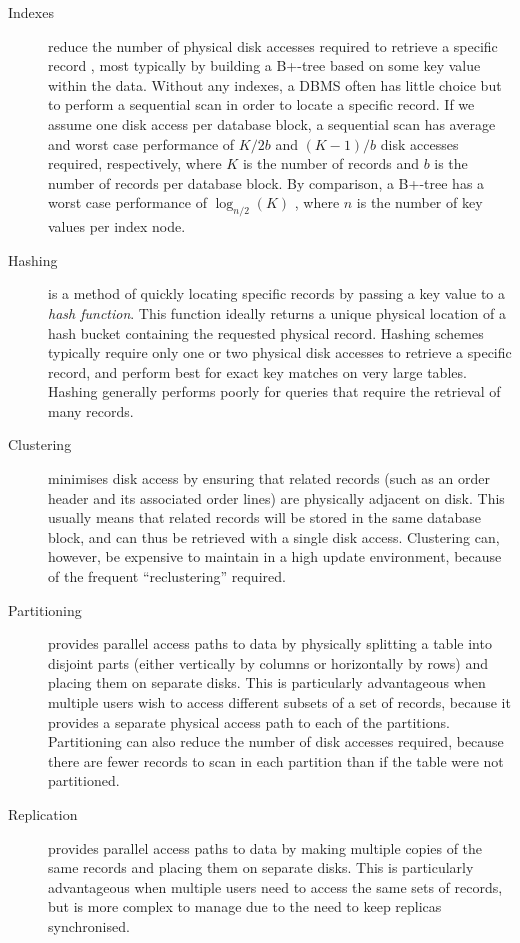 \documentclass{CRPITStyle}
\begin{document}
\begin{description}

	\item[Indexes] reduce the number of physical disk accesses required
	to retrieve a specific record \cite{Roti-S-1996}, most typically by
	building a B+-tree \cite{Knut-DE-1997-Art} based on some key value
	within the data. Without any indexes, a DBMS often has little choice
	but to perform a sequential scan in order to locate a specific
	record. If we assume one disk access per database block, a
	sequential scan has average and worst case performance of \(K/2b\)
	and \((K - 1)/b\) disk accesses required, respectively, where \(K\)
	is the number of records and \(b\) is the number of records per
	database block. By comparison, a B+-tree has a worst case
	performance of \(\log_{n/2}(K)\) \cite{Silb-A-2002-4E}, where
	\(n\) is the number of key values per index node.

	\item[Hashing] is a method of quickly locating specific records by
	passing a key value to a \emph{hash function}. This function ideally
	returns a unique physical location of a hash bucket containing the
	requested physical record. Hashing schemes typically require only
	one or two physical disk accesses to retrieve a specific record, and
	perform best for exact key matches on very large tables. Hashing
	generally performs poorly for queries that require the retrieval of
	many records.

	\item[Clustering] minimises disk access by ensuring that related
	records (such as an order header and its associated order lines) are
	physically adjacent on disk. This usually means that related records
	will be stored in the same database block, and can thus be retrieved
	with a single disk access. Clustering can, however, be expensive to
	maintain in a high update environment, because of the frequent
	``reclustering'' required.

	\item[Partitioning] provides parallel access paths to data by
	physically splitting a table into disjoint parts (either vertically
	by columns or horizontally by rows) and placing them on separate
	disks. This is particularly advantageous when multiple users wish to
	access different subsets of a set of records, because it provides a
	separate physical access path to each of the partitions.
	Partitioning can also reduce the number of disk accesses required,
	because there are fewer records to scan in each partition than if
	the table were not partitioned.

	\item[Replication] provides parallel access paths to data by making
	multiple copies of the same records and placing them on separate
	disks. This is particularly advantageous when multiple users need to
	access the same sets of records, but is more complex to manage due
	to the need to keep replicas synchronised.

\end{description}
\end{document}
